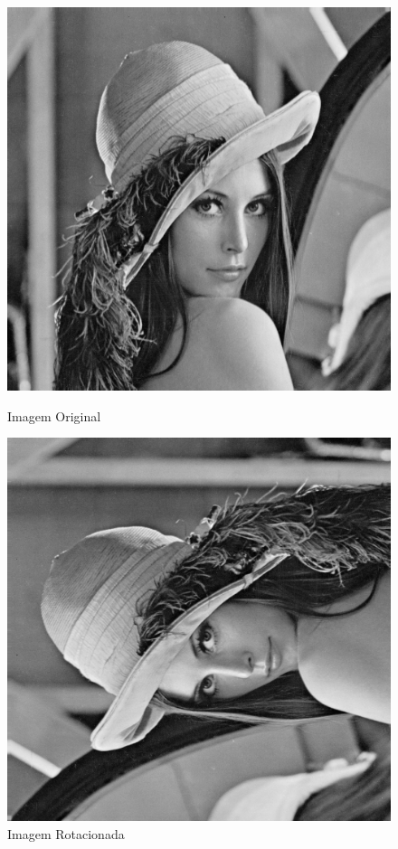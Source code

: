 \documentclass{article}
\begin{document}
\begin{figure}[!htb]
\begin{minipage}[b]{0.45\linewidth}
\centering
\includegraphics[scale=0.32]{lena_B.png}
\caption{Imagem Original}
\label{fig:original}
\end{minipage}
\hspace{0.5cm}
\begin{minipage}[b]{0.45\linewidth}
\centering
\includegraphics[scale=0.32]{TransLinearRot.png}
\caption{Imagem Rotacionada}
\label{fig:rota}
\end{minipage}
\end{figure}
\end{document}
